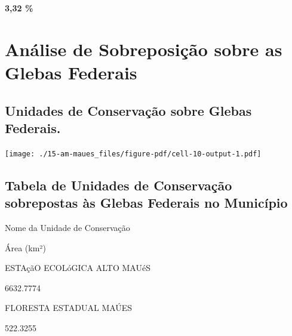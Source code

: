 \documentclass[
  letterpaper,
]{report}
\begin{document}
\textbf{3,32 \%}

\hypertarget{anuxe1lise-de-sobreposiuxe7uxe3o-sobre-as-glebas-federais}{%
\section{Análise de Sobreposição sobre as Glebas
Federais}\label{anuxe1lise-de-sobreposiuxe7uxe3o-sobre-as-glebas-federais}}

\hypertarget{unidades-de-conservauxe7uxe3o-sobre-glebas-federais.}{%
\subsection{Unidades de Conservação sobre Glebas
Federais.}\label{unidades-de-conservauxe7uxe3o-sobre-glebas-federais.}}

\texttt{[image: ./15-am-maues\_files/figure-pdf/cell-10-output-1.pdf]}

\hypertarget{tabela-de-unidades-de-conservauxe7uxe3o-sobrepostas-uxe0s-glebas-federais-no-municuxedpio}{%
\subsection{Tabela de Unidades de Conservação sobrepostas às Glebas
Federais no
Município}\label{tabela-de-unidades-de-conservauxe7uxe3o-sobrepostas-uxe0s-glebas-federais-no-municuxedpio}}

\n  

\n    

\n      

Nome da Unidade de Conservação

\n      

Área (km²)

\n    

\n  

\n  

\n    

\n      

ESTAçãO ECOLóGICA ALTO MAUéS

\n      

6632.7774

\n    

\n    

\n      

FLORESTA ESTADUAL MAÚES

\n      

522.3255

\n    

\n    

\n      
\end{document}
